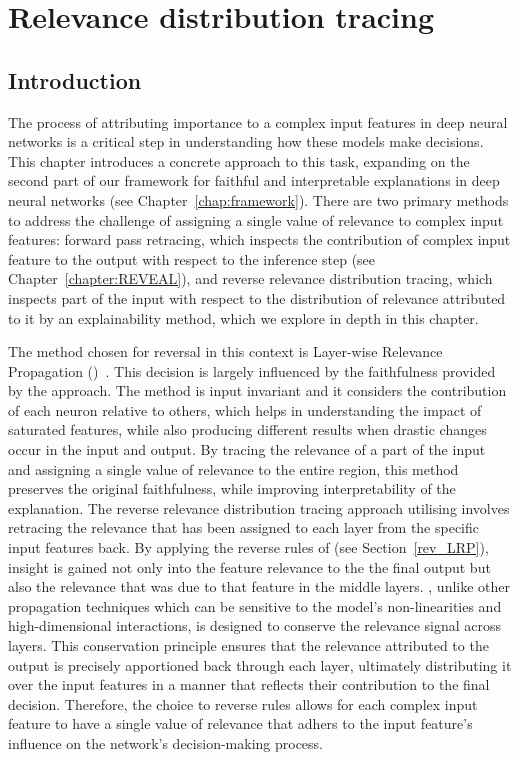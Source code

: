 \chapter{Relevance distribution tracing}
\label{chapter:revLRP}
\section{Introduction}

The process of attributing importance to a complex input features in deep neural networks is a critical step in understanding how these models make decisions. This chapter introduces a concrete approach to this task, expanding on the second part of our framework for faithful and interpretable explanations in deep neural networks (see Chapter~\ref{chap:framework}). There are two primary methods to address the challenge of assigning a single value of relevance to complex input features: forward pass retracing, which inspects the contribution of complex input feature to the output with respect to the inference step (see Chapter~\ref{chapter:REVEAL}), and reverse relevance distribution tracing, which inspects part of the input with respect to the distribution of relevance attributed to it by an explainability method, which we explore in depth in this chapter.


The method chosen for reversal in this context is Layer-wise Relevance Propagation (\LRP\/)~\cite{bach2015pixel}. This decision is largely influenced by the faithfulness provided by the approach. The method is input invariant and it considers the contribution of each neuron relative to others, which helps in understanding the impact of saturated features, while also producing different results when drastic changes occur in the input and output. By tracing the relevance of a part of the input and assigning a single value of relevance to the entire region, this method preserves the original faithfulness, while improving interpretability of the explanation. The reverse relevance distribution tracing approach utilising \LRP\/ involves retracing the relevance that has been assigned to each layer from the specific input features back. By applying the reverse rules of \LRP\/ (see Section~\ref{rev_LRP}), insight is gained not only into the feature relevance to the the final output but also the relevance that was due to that feature in the middle layers. \LRP, unlike other propagation techniques which can be sensitive to the model's non-linearities and high-dimensional interactions, is designed to conserve the relevance signal across layers. This conservation principle ensures that the relevance attributed to the output is precisely apportioned back through each layer, ultimately distributing it over the input features in a manner that reflects their contribution to the final decision. Therefore, the choice to reverse \LRP\/ rules allows for each complex input feature to have a single value of relevance that adhers to the input feature's influence on the network's decision-making process. 


